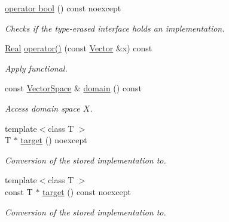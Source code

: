 \begin{DoxyCompactItemize}
\item 
\hyperlink{classSpacy_1_1Functional_a9389924b8e141796b02879a26f37d7b0}{operator bool} () const noexcept
\begin{DoxyCompactList}\small\item\em \-Checks if the type-\/erased interface holds an implementation. \end{DoxyCompactList}\item 
\hypertarget{classSpacy_1_1Functional_af51f903133f2fbf92cf12f790e429919}{\hyperlink{classSpacy_1_1Real}{\-Real} \hyperlink{classSpacy_1_1Functional_af51f903133f2fbf92cf12f790e429919}{operator()} (const \hyperlink{classSpacy_1_1Vector}{\-Vector} \&x) const }\label{classSpacy_1_1Functional_af51f903133f2fbf92cf12f790e429919}

\begin{DoxyCompactList}\small\item\em \-Apply functional. \end{DoxyCompactList}\item 
\hypertarget{classSpacy_1_1Functional_a6f4ada552c025579bcce852316a071be}{const \hyperlink{classSpacy_1_1VectorSpace}{\-Vector\-Space} \& \hyperlink{classSpacy_1_1Functional_a6f4ada552c025579bcce852316a071be}{domain} () const }\label{classSpacy_1_1Functional_a6f4ada552c025579bcce852316a071be}

\begin{DoxyCompactList}\small\item\em \-Access domain space $X$. \end{DoxyCompactList}\item 
{\footnotesize template$<$class T $>$ }\\\-T $\ast$ \hyperlink{classSpacy_1_1Functional_a198a232d6aebbc15f7ab330b8294c8b4}{target} () noexcept
\begin{DoxyCompactList}\small\item\em \-Conversion of the stored implementation to. \end{DoxyCompactList}\item 
{\footnotesize template$<$class T $>$ }\\const \-T $\ast$ \hyperlink{classSpacy_1_1Functional_ab11a7ac418f216df78ff928893e10345}{target} () const noexcept
\begin{DoxyCompactList}\small\item\em \-Conversion of the stored implementation to. \end{DoxyCompactList}\end{DoxyCompactItemize}


